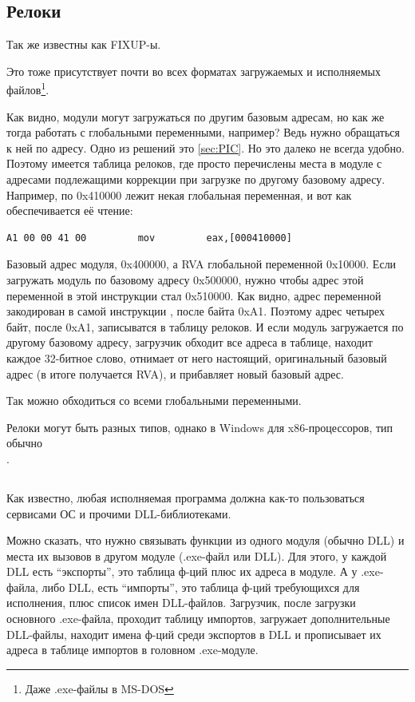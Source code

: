 \subsection{Релоки}

Так же известны как FIXUP-ы.

Это тоже присутствует почти во всех форматах загружаемых и исполняемых файлов\footnote{Даже .exe-файлы в MS-DOS}.

Как видно, модули могут загружаться по другим базовым адресам, но как же тогда работать с глобальными переменными,
например? Ведь нужно обращаться к ней по адресу. Одно из решений это \PICcode\ref{sec:PIC}. 
Но это далеко не всегда удобно.
Поэтому имеется таблица релоков, где просто перечислены места в модуле с адресами подлежащими коррекции при загрузке
по другому базовому адресу.
Например, по 0x410000 лежит некая глобальная переменная, и вот как обеспечивается её чтение:

\begin{lstlisting}
A1 00 00 41 00         mov         eax,[000410000]
\end{lstlisting}

Базовый адрес модуля, 0x400000, а \ac{RVA} глобальной переменной 0x10000. Если загружать модуль по базовому адресу
0x500000, нужно чтобы адрес этой переменной в этой инструкции стал 0x510000. Как видно, адрес переменной закодирован
в самой инструкции , после байта 0xA1. Поэтому адрес четырех байт, после 0xA1, записыватся в таблицу релоков.
И если модуль загружается по другому базовому адресу, загрузчик обходит все адреса в таблице, находит каждое 32-битное
слово, отнимает от него настоящий, оригинальный базовый адрес (в итоге получается \ac{RVA}), и прибавляет новый базовый адрес.

Так можно обходиться со всеми глобальными переменными.

Релоки могут быть разных типов, однако в Windows для x86-процессоров, тип обычно \\
.

\subsection{}

Как известно, любая исполняемая программа должна как-то пользоваться сервисами ОС и прочими DLL-библиотеками.

Можно сказать, что нужно связывать функции из одного модуля (обычно DLL) и места их вызовов в 
другом модуле (.exe-файл или DLL). 
Для этого, у каждой DLL есть ``экспорты'', это таблица ф-ций плюс их адреса в модуле.
А у .exe-файла, либо DLL, есть ``импорты'', это таблица ф-ций требующихся для исполнения, плюс список имен DLL-файлов.
Загрузчик, после загрузки основного .exe-файла, проходит таблицу импортов, загружает дополнительные DLL-файлы, 
находит имена ф-ций среди экспортов в DLL и прописывает их адреса в таблице импортов в головном .exe-модуле.

